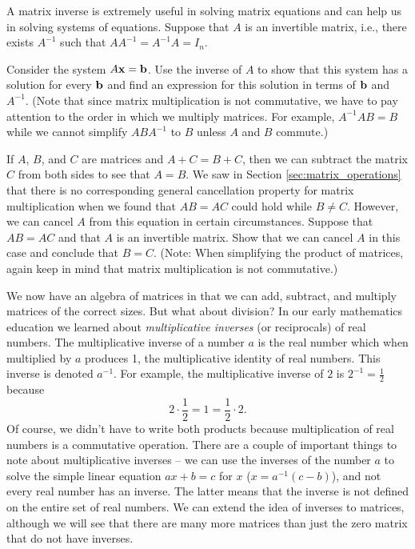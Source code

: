 \begin{pa}
\begin{enumerate}[i.]
		\end{enumerate}
	\ea

\item A matrix inverse is extremely useful in solving matrix equations and can help us in solving systems of equations. Suppose that $A$ is an invertible matrix, i.e., there exists $A^{-1}$ such that $AA^{-1}=A^{-1}A=I_n$.

\ba 

\item Consider the system $A\mathbf{x}=\mathbf{b}$. Use the inverse of $A$ to show that this system has a solution for every $\mathbf{b}$ and find an expression for this solution in terms of $\mathbf{b}$ and $A^{-1}$. (Note that since matrix multiplication is not commutative, we have to pay attention to the order in which we multiply matrices. For example, $A^{-1}AB=B$ while we cannot simplify $ABA^{-1}$ to $B$ unless $A$ and $B$ commute.)

\item If $A$, $B$, and $C$ are matrices and $A+C = B+C$, then we can subtract the matrix $C$ from both sides to see that $A = B$. We saw in Section \ref{sec:matrix_operations} that there is no corresponding general cancellation property for matrix multiplication when we found that $AB=AC$ could hold while $B\neq C$. However, we can cancel $A$ from this equation in certain circumstances. Suppose that $AB=AC$ and that $A$ is an invertible matrix. Show that we can cancel $A$ in this case and conclude that $B=C$. (Note: When simplifying the product of matrices, again keep in mind that matrix multiplication is not commutative.)

\ea

\ee

\end{pa}


\label{sec:mtx_invertible}

We now have an algebra of matrices in that we can add, subtract, and multiply matrices of the correct sizes. But what about division? In our early mathematics education we learned about \emph{multiplicative inverses} (or reciprocals) of real numbers. The multiplicative inverse of a number $a$ is the real number which when multiplied by $a$ produces 1, the multiplicative identity of real numbers. This inverse is denoted $a^{-1}$. For example, the multiplicative inverse of $2$ is $2^{-1}=\frac{1}{2}$ because 
\[2\cdot \frac{1}{2} = 1 = \frac{1}{2}\cdot 2.\]
Of course, we didn't have to write both products because multiplication of real numbers is a commutative operation.  There are a couple of important things to note about multiplicative inverses -- we can use the inverses of the number $a$ to solve the simple linear equation $ax+b = c$ for $x$ ($x = a^{-1}(c-b)$), and not every real number has an inverse. The latter means that the inverse is not defined on the entire set of real numbers. We can extend the idea of inverses to matrices, although we will see that there are many more matrices than just the zero matrix that do not have inverses.

